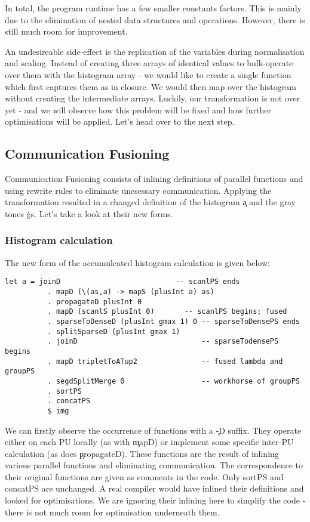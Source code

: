     In total, the program runtime has a few smaller constants factors. This is mainly due to the elimination of nested data structures
    and operations. However, there is still much room for improvement.
    
    An undesireable side-effect
    is the replication of the variables during normalisation and scaling. Instead of creating three arrays of identical values
    to bulk-operate over them with the histogram array - we would like to create a single function which first
    captures them as in closure. We would then map over the histogram without creating the intermediate arrays.
    Luckily, our transformation is not over yet - and we will observe how this problem will be fixed and how further optimisations will be applied.
    Let's head over to the next step.
    
  \subsection{Communication Fusioning}
    
    Communication Fusioning consists of inlining definitions of parallel functions and using rewrite rules to eliminate
    unesessary communication. Applying the transformation resulted in a changed definition of the histogram \c{a} and the
    gray tones \c{gs}. Let's take a look at their new forms.
    
    \subsubsection{Histogram calculation}
      The new form of the accumulcated histogram calculation is given below:
      \begin{lstlisting}
let a = joinD                           -- scanlPS ends
          . mapD (\(as,a) -> mapS (plusInt a) as)
          . propagateD plusInt 0
          . mapD (scanlS plusInt 0)       -- scanlPS begins; fused
          . sparseToDenseD (plusInt gmax 1) 0 -- sparseToDensePS ends
          . splitSparseD (plusInt gmax 1)     
          . joinD                             -- sparseTodensePS begins
          . mapD tripletToATup2               -- fused lambda and groupPS 
          . segdSplitMerge 0                  -- workhorse of groupPS
          . sortPS
          . concatPS
          $ img
      \end{lstlisting}
      We can firstly observe the occurrence of functions with a \c{-D} suffix. They operate either
      on each PU locally (as with \c{mapD}) or implement some specific inter-PU calculation (as does \c{propagateD}).
      These functions are the result of inlining various parallel functions and eliminating communication.
      The correspondence to their original functions are given as comments in the code. Only sortPS and concatPS
      are unchanged. A real compiler would have inlined their definitions and looked for optimisations.
      We are ignoring their inlining here to simplify the code - there is not much room for optimisation underneath them.
      
